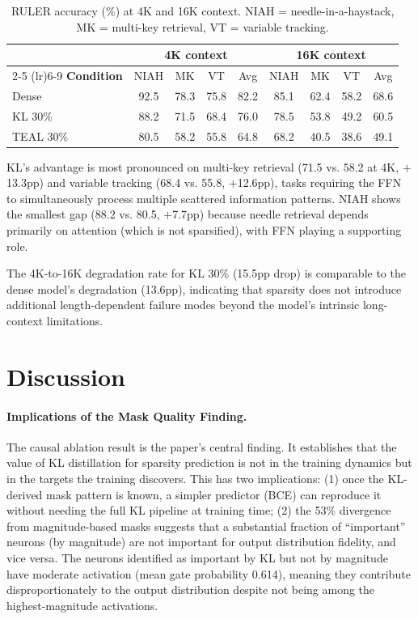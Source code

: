 \documentclass[11pt,a4paper]{article}
\begin{document}
\begin{table}[h]
\centering
\small
\caption{RULER accuracy (\%) at 4K and 16K context. NIAH = needle-in-a-haystack, MK = multi-key retrieval, VT = variable tracking.}
\label{tab:ruler}
\begin{tabular}{l ccc c ccc c}
\toprule
 & \multicolumn{4}{c}{\textbf{4K context}} & \multicolumn{4}{c}{\textbf{16K context}} \\
\cmidrule(lr){2-5} \cmidrule(lr){6-9}
\textbf{Condition} & NIAH & MK & VT & Avg & NIAH & MK & VT & Avg \\
\midrule
Dense & 92.5 & 78.3 & 75.8 & 82.2 & 85.1 & 62.4 & 58.2 & 68.6 \\
KL 30\% & 88.2 & 71.5 & 68.4 & 76.0 & 78.5 & 53.8 & 49.2 & 60.5 \\
TEAL 30\% & 80.5 & 58.2 & 55.8 & 64.8 & 68.2 & 40.5 & 38.6 & 49.1 \\
\bottomrule
\end{tabular}
\end{table}

KL's advantage is most pronounced on multi-key retrieval (71.5 vs. 58.2 at 4K, $+$13.3pp) and variable tracking (68.4 vs. 55.8, $+$12.6pp), tasks requiring the FFN to simultaneously process multiple scattered information patterns.
NIAH shows the smallest gap (88.2 vs. 80.5, $+$7.7pp) because needle retrieval depends primarily on attention (which is not sparsified), with FFN playing a supporting role.

The 4K-to-16K degradation rate for KL 30\% (15.5pp drop) is comparable to the dense model's degradation (13.6pp), indicating that sparsity does not introduce additional length-dependent failure modes beyond the model's intrinsic long-context limitations.

\section{Discussion}

\paragraph{Implications of the Mask Quality Finding.}
The causal ablation result is the paper's central finding.
It establishes that the value of KL distillation for sparsity prediction is not in the training dynamics but in the targets the training discovers.
This has two implications: (1) once the KL-derived mask pattern is known, a simpler predictor (BCE) can reproduce it without needing the full KL pipeline at training time; (2) the 53\% divergence from magnitude-based masks suggests that a substantial fraction of ``important'' neurons (by magnitude) are not important for output distribution fidelity, and vice versa.
The neurons identified as important by KL but not by magnitude have moderate activation (mean gate probability 0.614), meaning they contribute disproportionately to the output distribution despite not being among the highest-magnitude activations.
\end{document}
